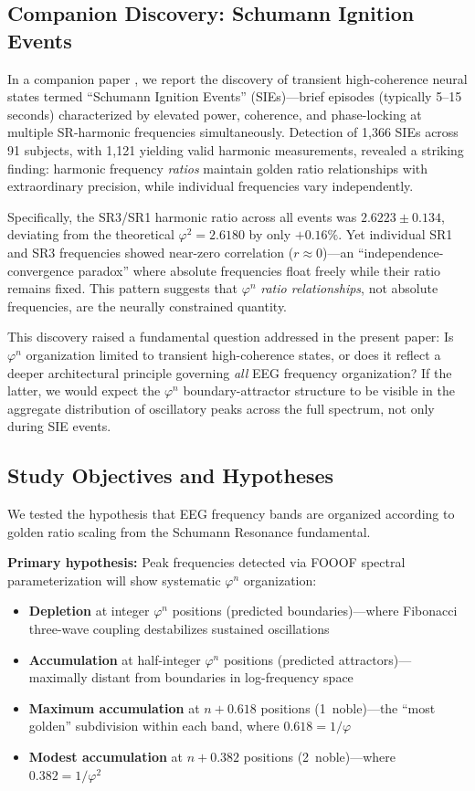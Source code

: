 \documentclass[11pt,a4paper]{article}
\newcommand{\phisym}{\varphi}
\begin{document}
\subsection{Companion Discovery: Schumann Ignition Events}

In a companion paper \citep{lacy_sie}, we report the discovery of transient high-coherence neural states termed ``Schumann Ignition Events'' (SIEs)---brief episodes (typically 5--15 seconds) characterized by elevated power, coherence, and phase-locking at multiple SR-harmonic frequencies simultaneously. Detection of 1,366 SIEs across 91 subjects, with 1,121 yielding valid harmonic measurements, revealed a striking finding: harmonic frequency \textit{ratios} maintain golden ratio relationships with extraordinary precision, while individual frequencies vary independently.

Specifically, the SR3/SR1 harmonic ratio across all events was $2.6223 \pm 0.134$, deviating from the theoretical $\phisym^2 = 2.6180$ by only $+0.16\%$. Yet individual SR1 and SR3 frequencies showed near-zero correlation ($r \approx 0$)---an ``independence-convergence paradox'' where absolute frequencies float freely while their ratio remains fixed. This pattern suggests that $\phisym^n$ \textit{ratio relationships}, not absolute frequencies, are the neurally constrained quantity.

This discovery raised a fundamental question addressed in the present paper: Is $\phisym^n$ organization limited to transient high-coherence states, or does it reflect a deeper architectural principle governing \textit{all} EEG frequency organization? If the latter, we would expect the $\phisym^n$ boundary-attractor structure to be visible in the aggregate distribution of oscillatory peaks across the full spectrum, not only during SIE events.

\subsection{Study Objectives and Hypotheses}

We tested the hypothesis that EEG frequency bands are organized according to golden ratio scaling from the Schumann Resonance fundamental.

\textbf{Primary hypothesis:} Peak frequencies detected via FOOOF spectral parameterization will show systematic $\phisym^n$ organization:
\begin{itemize}
    \item \textbf{Depletion} at integer $\phisym^n$ positions (predicted boundaries)---where Fibonacci three-wave coupling destabilizes sustained oscillations
    \item \textbf{Accumulation} at half-integer $\phisym^n$ positions (predicted attractors)---maximally distant from boundaries in log-frequency space
    \item \textbf{Maximum accumulation} at $n + 0.618$ positions (1\degree\ noble)---the ``most golden'' subdivision within each band, where $0.618 = 1/\phisym$
    \item \textbf{Modest accumulation} at $n + 0.382$ positions (2\degree\ noble)---where $0.382 = 1/\phisym^2$
\end{itemize}
\end{document}
